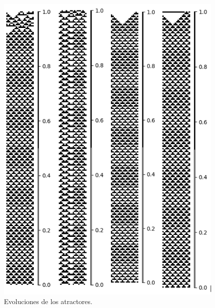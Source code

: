 \documentclass[11pt]{article}
\begin{document}
			\begin{figure}[H]
			\centering
			\includegraphics[scale=0.3]{resources/Atractores54/atractor_54_size_20_res.png}
			\caption{Evoluciones de los atractores.}\label{fig:picture}
			\end{figure}
\end{document}
